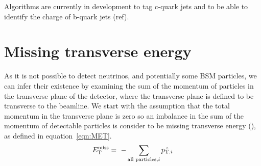 Algorithms are currently in development to tag c-quark jets and to be able to identify the charge of b-quark jets (ref).

\section{Missing transverse energy}
As it is not possible to detect neutrinos, and potentially some BSM particles, we can infer their existence by examining the sum of the momentum of particles in the transverse plane of the detector, where the transverse plane is defined to be transverse to the beamline. We start with the assumption that the total momentum in the transverse plane is zero so an imbalance in the sum of the momentum of detectable particles is consider to be missing transverse energy (\ETmiss), as defined in equation~\ref{eqn:MET}.
\begin{equation}
E_{\mathrm{T}}^{\text{miss}} = ~- \sum_{\textrm{all particles,}i} \hat{ {p}_{\textrm{T},i} }
\label{eqn:MET}
\end{equation}



